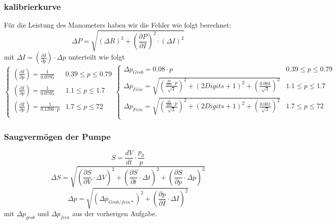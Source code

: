 \documentclass[12pt]{article}
\begin{document}
	\subsubsection{kalibrierkurve}
	Für die Leistung des Manometers haben wir die Fehler wie folgt berechnet:
	\begin{equation}
		\Delta P= \sqrt{(\Delta R)^2+ \left(\frac{\partial P}{\partial I}\right)^2\cdot (\Delta I)^2}
	\end{equation}
	mit $\Delta I = \left(\frac{\partial I}{\partial p}\right)\cdot \Delta p $ unterteilt wie folgt
	\begin{equation*}
	\begin{cases}
		\left(\frac{\partial I}{\partial p}\right)= \frac{1}{0.0795} &  0.39 \leq p \leq 0.79 \\
		\left(\frac{\partial I}{\partial p}\right)= \frac{1}{0.0795} & 1.1 \leq p \leq 1.7 \\
		\left(\frac{\partial I}{\partial p}\right)= \frac{1}{0.1206 \cdot p} & 1.7 \leq p \leq 72 \\
	\end{cases}
	\begin{cases}
		\Delta p_{Grob}= 0.08 \cdot p  &  0.39 \leq p \leq 0.79 \\
		\Delta p_{Fein}=\sqrt{\left(\frac{\frac{20}{100}\cdot p}{\sqrt{3}}\right)^2+(2Digits+1)^2+\left(\frac{0.001}{\sqrt{3}}\right)^2} & 1.1 \leq p \leq 1.7 \\
		\Delta p_{Fein}=\sqrt{\left(\frac{\frac{20}{100}\cdot p}{\sqrt{3}}\right)^2+(2Digits+1)^2+\left(\frac{0.001}{\sqrt{3}}\right)^2} & 1.7 \leq p \leq 72 \\
	\end{cases}
	\end{equation*}
	\subsubsection{Saugvermögen der Pumpe} 
	 \begin{equation}
		S= \frac{dV}{dt}\cdot \frac{p_0}{p}
	\end{equation}
	\begin{equation}	
		\Delta S= \sqrt{\left(\frac{\partial S}{\partial V}\cdot \Delta V\right)^2+\left(\frac{\partial S}{\partial t}\cdot\Delta t \right)^2+\left(\frac{\partial S}{\partial p}\cdot\Delta p \right)^2}
	 \end{equation}
 \begin{equation}
 	\Delta p = \sqrt{(\Delta p_{Grob/fein*})^2+\left(\frac{\partial p}{\partial I}\cdot \Delta I\right)^2}
 \end{equation}
 mit $\Delta p_{grob}$ und $\Delta p_{fein}$ aus der vorherigen Aufgabe.
\end{document}
